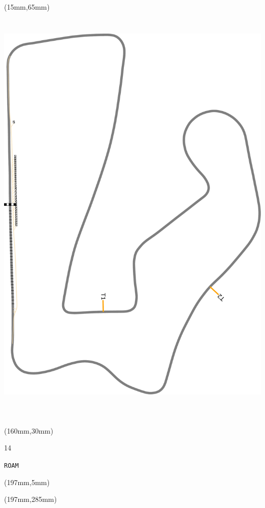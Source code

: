 \begin{textblock*}{185mm}(15mm,65mm)%
\centering
\mbox{\includegraphics[width=185mm,height=210mm,keepaspectratio]{PT/ROAM.pdf}}
\end{textblock*}
\begin{textblock*}{40mm}(160mm,30mm)%
\Large
\par{} 
\par14 
\par\hfill\tiny\tt ROAM\\
\end{textblock*}
\begin{textblock*}{20mm}(197mm,5mm)%
\fbox{\thepage}
\label{ROAM}
\end{textblock*}
\begin{textblock*}{20mm}(197mm,285mm)%
\fbox{\thepage}
\end{textblock*}

